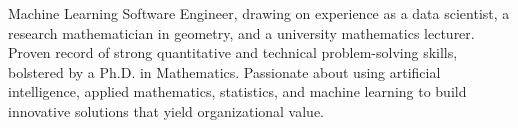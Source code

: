 

\begin{cvparagraph}


Machine Learning Software Engineer, drawing on experience as a data scientist, a research mathematician in geometry, and a university mathematics lecturer. Proven record of strong quantitative and technical problem-solving skills, bolstered by a Ph.D. in Mathematics. Passionate about using artificial intelligence, applied mathematics, statistics, and machine learning to build innovative solutions that yield organizational value.

\end{cvparagraph}
